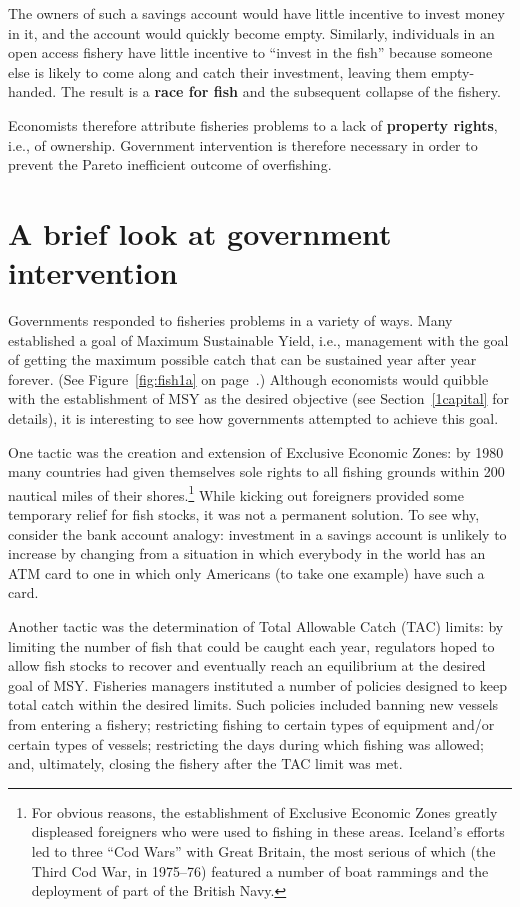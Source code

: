 The owners of such a savings account would have little incentive to invest money in it, and the account would quickly become empty. Similarly, individuals in an open access fishery have little incentive to ``invest in the fish'' because someone else is likely to come along and catch their investment, leaving them empty-handed. The result is a \textbf{race for fish} and the subsequent collapse of the fishery.

Economists therefore attribute fisheries problems to a lack of \textbf{property rights}, i.e., of ownership. Government intervention is therefore necessary in order to prevent the Pareto inefficient outcome of overfishing.

\section{A brief look at government intervention}

Governments responded to fisheries problems in a variety of ways. Many established a goal of Maximum Sustainable Yield, i.e., management with the goal of getting the maximum possible catch that can be sustained year after year forever. (See Figure~\ref{fig:fish1a} on page~\pageref{fig:fish1a}.) Although economists would quibble with the establishment of MSY as the desired objective (see Section~\ref{1capital} for details), it is interesting to see how governments attempted to achieve this goal.

One tactic was the creation and extension of Exclusive Economic Zones: by 1980 many countries had given themselves sole rights to all fishing grounds within 200 nautical miles of their shores.\footnote{For obvious reasons, the establishment of Exclusive Economic Zones greatly displeased foreigners who were used to fishing in these areas. Iceland's efforts led to three ``Cod Wars'' with Great Britain, the most serious of which (the Third Cod War, in 1975--76) featured a number of boat rammings and the deployment of part of the British Navy.} %
While kicking out foreigners provided some temporary relief for fish stocks, it was not a permanent solution. To see why, consider the bank account analogy: investment in a savings account is unlikely to increase by changing from a situation in which everybody in the world has an ATM card to one in which only Americans (to take one example) have such a card.

Another tactic was the determination of Total Allowable Catch (TAC) limits: by limiting the number of fish that could be caught each year, regulators hoped to allow fish stocks to recover and eventually reach an equilibrium at the desired goal of MSY. Fisheries managers instituted a number of policies designed to keep total catch within the desired limits. Such policies included banning new vessels from entering a fishery; restricting fishing to certain types of equipment and/or certain types of vessels; restricting the days during which fishing was allowed; and, ultimately, closing the fishery after the TAC limit was met.

